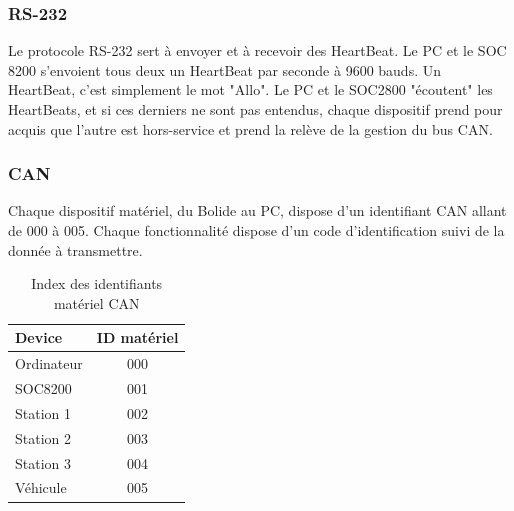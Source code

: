 \documentclass[10pt,a4paper,final]{article}
\begin{document}
\begin{spacing}{1.5}
\subsubsection{RS-232}
Le protocole RS-232 sert à envoyer et à recevoir des HeartBeat. Le PC et le SOC 8200 s'envoient tous deux un HeartBeat par seconde à 9600 bauds. Un HeartBeat, c'est simplement le mot "Allo". Le PC et le SOC2800 "écoutent" les HeartBeats, et si ces derniers ne sont pas entendus, chaque dispositif prend pour acquis que l'autre est hors-service et prend la relève de la gestion du bus CAN.
\pagebreak
\subsubsection{CAN}
Chaque dispositif matériel, du Bolide au PC, dispose d'un identifiant CAN allant de 000 à 005. Chaque fonctionnalité dispose d'un code d'identification suivi de la donnée à transmettre.

\begin{table}[!ht]
\caption{Index des identifiants matériel CAN}
\medskip
\centering
\begin{tabular}{|l|c|}
\hline 
\textbf{Device} & \textbf{ID matériel} \\ 
\hline 
Ordinateur & 000 \\ 
\hline 
SOC8200 & 001 \\ 
\hline 
Station 1 & 002 \\ 
\hline 
Station 2  & 003 \\ 
\hline
Station 3  & 004 \\
\hline 
Véhicule  & 005 \\ 
\hline 
\end{tabular} 
\label{tab:testtab1}
\end{table} 



\end{spacing}
\end{document}
